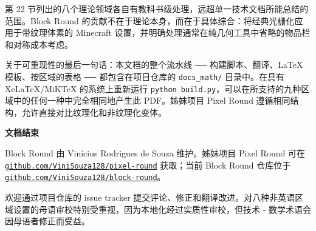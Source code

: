 \documentclass[12pt,a4paper]{scrartcl}
\newcommand{\code}[1]{\texttt{\small #1}}
\newcommand{\biblink}[2]{\href{#1}{\nolinkurl{#2}}}
\begin{document}
第 22 节列出的八个理论领域各自有教科书级处理，远超单一技术文档所能总结的范围。Block Round 的贡献不在于理论本身，而在于具体综合：将经典光栅化应用于带纹理体素的 Minecraft 设置，并明确处理通常在纯几何工具中省略的物品栏和对称成本考虑。

关于可重现性的最后一句话：本文档的整个流水线 ── 构建脚本、翻译、LaTeX 模板、按区域的表格 ── 都包含在项目仓库的 \code{docs\_math/} 目录中。在具有 XeLaTeX/MiKTeX 的系统上重新运行 \code{python build.py}，可以在所支持的九种区域中的任何一种中完全相同地产生此 PDF。姊妹项目 Pixel Round 遵循相同结构，允许直接对比纹理化和非纹理化变体。

\vspace{1.2em}

\begin{center}
{\sffamily\bfseries\color{accent}文档结束}
\end{center}

\vspace{0.6em}

Block Round 由 Vinícius Rodrigues de Souza 维护。姊妹项目 Pixel Round 可在 \biblink{https://github.com/ViniSouza128/pixel-round}{github.com/ViniSouza128/pixel-round} 获取；当前 Block Round 仓库位于 \biblink{https://github.com/ViniSouza128/block-round}{github.com/ViniSouza128/block-round}。

欢迎通过项目仓库的 issue tracker 提交评论、修正和翻译改进。对八种非英语区域设置的母语审校特别受重视，因为本地化经过实质性审校，但技术 - 数学术语会因母语者修正而受益。
\end{document}

